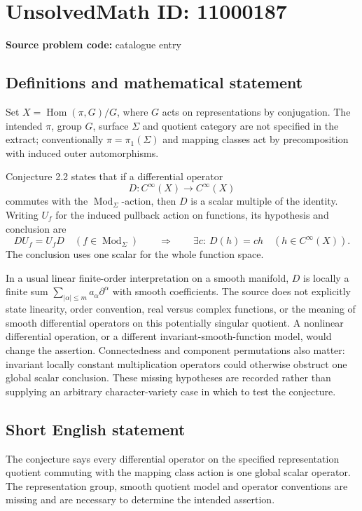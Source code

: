 \documentclass[11pt]{article}
\begin{document}
\section*{UnsolvedMath ID: 11000187}
\textbf{Source problem code:} catalogue entry
\subsection{Definitions and mathematical statement}
Set \(X=\operatorname{Hom}(\pi,G)/G\), where \(G\) acts on representations by conjugation. The intended \(\pi\), group \(G\), surface \(\Sigma\) and quotient category are not specified in the extract; conventionally \(\pi=\pi_1(\Sigma)\) and mapping classes act by precomposition with induced outer automorphisms.

Conjecture 2.2 states that if a differential operator
\[
 D:C^\infty(X)\longrightarrow C^\infty(X)
\]
commutes with the \(\operatorname{Mod}_\Sigma\)-action, then \(D\) is a scalar multiple of the identity. Writing \(U_f\) for the induced pullback action on functions, its hypothesis and conclusion are
\[
 DU_f=U_fD\quad(f\in\operatorname{Mod}_\Sigma)
 \qquad\Longrightarrow\qquad
 \exists c:\ D(h)=ch\quad(h\in C^\infty(X)).
\]
The conclusion uses one scalar for the whole function space.

In a usual linear finite-order interpretation on a smooth manifold, \(D\) is locally a finite sum \(\sum_{|\alpha|\le m}a_\alpha\partial^\alpha\) with smooth coefficients. The source does not explicitly state linearity, order convention, real versus complex functions, or the meaning of smooth differential operators on this potentially singular quotient. A nonlinear differential operation, or a different invariant-smooth-function model, would change the assertion. Connectedness and component permutations also matter: invariant locally constant multiplication operators could otherwise obstruct one global scalar conclusion. These missing hypotheses are recorded rather than supplying an arbitrary character-variety case in which to test the conjecture.
\subsection{Short English statement}
The conjecture says every differential operator on the specified representation quotient commuting with the mapping class action is one global scalar operator. The representation group, smooth quotient model and operator conventions are missing and are necessary to determine the intended assertion.
\end{document}
